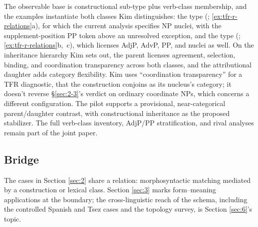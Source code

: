 The observable base is constructional sub-type plus verb-class membership, and the examples instantiate both classes Kim \autocite*[40]{kim-2026-indeterminacy-free-relatives} distinguishes: the  type (; \ref{ex:tfr-r-relations}a), for which the current analysis specifies NP nuclei, with the supplement-position PP token above an unresolved exception, and the  type (; \ref{ex:tfr-r-relations}b,~c), which licenses AdjP, AdvP, PP, and  nuclei as well. On the inheritance hierarchy Kim \autocite*[46]{kim-2026-indeterminacy-free-relatives} sets out, the parent licenses agreement, selection, binding, and coordination transparency across both classes, and the attributional daughter adds category flexibility. Kim uses \enquote{coordination transparency} for a TFR diagnostic, that the construction conjoins as its nucleus's category; it doesn't reverse §\ref{sec:2-3}'s verdict on ordinary coordinate NPs, which concerns a different configuration. The pilot supports a provisional, near-categorical parent/daughter contrast, with constructional inheritance as the proposed stabilizer. The full verb-class inventory, AdjP/PP stratification, and rival analyses remain part of the joint paper.

\subsection{Bridge}

The cases in Section \ref{sec:2} share a relation: morphosyntactic matching mediated by a construction or lexical class. Section \ref{sec:3} marks form--meaning applications at the boundary; the cross-linguistic reach of the schema, including the controlled Spanish and Tsez cases and the topology survey, is Section \ref{sec:6}'s topic.
